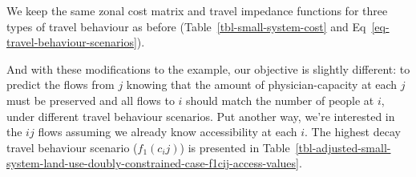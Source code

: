 \documentclass[
  10pt,
  letterpaper,
]{article}
\begin{document}
We keep the same zonal cost matrix and travel impedance functions for
three types of travel behaviour as before
(Table~\ref{tbl-small-system-cost} and
Eq~\ref{eq-travel-behaviour-scenarios}).

\begin{table}

\caption{\label{tbl-small-system-land-use-doubly-constrained-case}Modified
simple system with three zones reflecting matched population and
opportunities. Population is in 10,000 persons and opportunities in
10,000 of physician-capacity.}


\end{table}%

And with these modifications to the example, our objective is slightly
different: to predict the flows from \(j\) knowing that the amount of
physician-capacity at each \(j\) must be preserved and all flows to
\(i\) should match the number of people at \(i\), under different travel
behaviour scenarios. Put another way, we're interested in the \(ij\)
flows assuming we already know accessibility at each \(i\). The highest
decay travel behaviour scenario (\(f_1(c_ij)\)) is presented in
Table~\ref{tbl-adjusted-small-system-land-use-doubly-constrained-case-f1cij-access-values}.

\begin{table}

\caption{\label{tbl-adjusted-small-system-land-use-doubly-constrained-case-f1cij-access-values}Doubly-constrained
accessible opportunities assuming highest travel decay in the modified
simple system.}


\end{table}%
\end{document}

